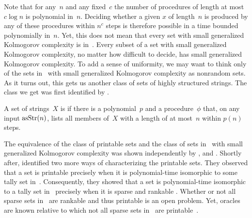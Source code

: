 Note that for any~$n$ and any fixed~$c$ the number of procedures of length at most $c\log n$ is polynomial in~$n$.
Deciding whether a given $x$ of length~$n$ is produced by any of these procedures within $n^c$ steps is therefore possible in a time bounded polynomially in~$n$.
Yet, this does not mean that every set with small generalized Kolmogorov complexity is in~.
Every subset of a set with small generalized Kolmogorov complexity, no matter how difficult to decide, has small generalized Kolmogorov complexity.
To add a sense of uniformity, we may want to think only of the sets in~ with small generalized Kolmogorov complexity as nonrandom sets.
As it turns out, this gets us another class of sets of highly structured strings.
The class we get was first identified by \textcite{hartmanis1984computation}.
\begin{definition}
  A set of strings~$X$ is  if there is a polynomial~$p$ and a procedure~$\phi$ that, on any input $\operatorname{asStr}(n)$, lists all members of~$X$ with a length of at most~$n$ within $p(n)$ steps.
\end{definition}

The equivalence of the class of \pdash{}printable sets and the class of sets in~ with small generalized Kolmogorov complexity was shown independently by \textcite{balcazar1986sets}, and \textcite{rubinstein1986note}.
Shortly after, \textcite{allender1988p-printable} identified two more ways of characterizing the \pdash{}printable sets.
They observed that a set is \pdash{}printable precisely when it is polynomial-time isomorphic to some tally set in~.
Consequently, they showed that a set is polynomial-time isomorphic to a tally set in~ precisely when it is sparse and \pdash{}rankable \parencite[see also][]{goldsmith1996scalability}.
Whether or not all sparse sets in~ are \pdash{}rankable and thus \pdash{}printable is an open problem.
Yet, oracles are known relative to which not all sparse sets in~ are \pdash{}printable~\parencite{hartmanis1983generalized}.

